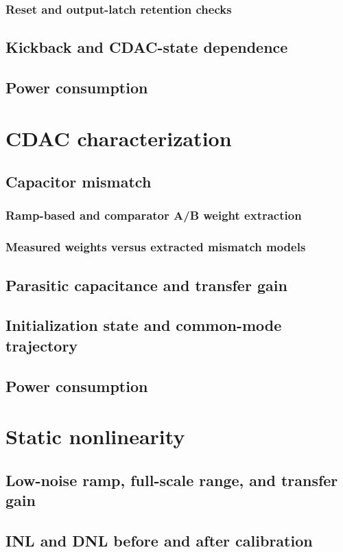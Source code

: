 \documentclass[PhD, UKenglish]{scrbook}
\begin{document}
\subsubsection{Reset and output-latch retention checks}
\subsection{Kickback and CDAC-state dependence}
\subsection{Power consumption}

\section{CDAC characterization}
\subsection{Capacitor mismatch}
\subsubsection{Ramp-based and comparator A/B weight extraction}
\subsubsection{Measured weights versus extracted mismatch models}
\subsection{Parasitic capacitance and transfer gain}
\subsection{Initialization state and common-mode trajectory}
\subsection{Power consumption}

\section{Static nonlinearity}
\subsection{Low-noise ramp, full-scale range, and transfer gain}
\subsection{INL and DNL before and after calibration}
\end{document}

